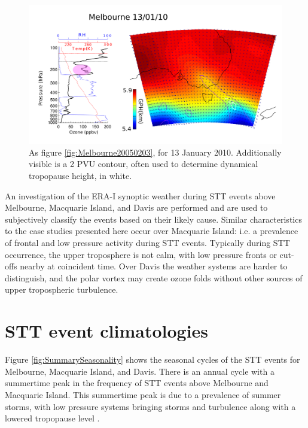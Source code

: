 \documentclass{article}
\begin{document}
  \begin{figure}[!htbp]
    \begin{center}
    \includegraphics[width=1.0\columnwidth]{figures/Melbourne20100113.png}
    \caption{As figure \ref{fig:Melbourne20050203}, for 13 January 2010.
     Additionally visible is a 2 PVU contour, often used to determine dynamical tropopause height, in white.}
    \label{fig:Melbourne20100113}
    \end{center}
  \end{figure}

  An investigation of the ERA-I synoptic weather during STT events above Melbourne, Macquarie Island, and Davis are performed and are used to subjectively classify the events based on their likely cause.
  Similar characteristics to the case studies presented here occur over Macquarie Island: i.e. a prevalence of frontal and low pressure activity during STT events.
  Typically during STT occurrence, the upper troposphere is not calm, with low pressure fronts or cut-offs nearby at coincident time.
  Over Davis the weather systems are harder to distinguish, and the polar vortex may create ozone folds without other sources of upper tropospheric turbulence.

\section{STT event climatologies}

  Figure \ref{fig:SummarySeasonality} shows the seasonal cycles of the STT events for Melbourne, Macquarie Island, and Davis. 
  There is an annual cycle with a summertime peak in the frequency of STT events above Melbourne and Macquarie Island.
  This summertime peak is due to a prevalence of summer storms, with low pressure systems bringing storms and turbulence along with a lowered tropopause level \citep{Reutter2015}.
  
\end{document}
